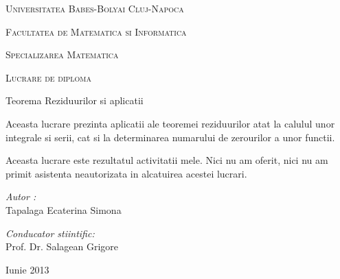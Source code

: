\documentclass[12pt,a4paper]{article}
\begin{document}
 \begin{center}
    { \textsc{Universitatea Babes-Bolyai Cluj-Napoca} \par
            \textsc{Facultatea de Matematica si Informatica} \par
            \textsc{Specializarea Matematica} \par }

    \vfill

    {\LARGE \textsc{Lucrare de diploma}}
    \null\vskip 1cm

    {\huge{Teorema Reziduurilor si aplicatii \par }}

    \vfill
    
    { 
    \begin{flushleft}
        Aceasta lucrare prezinta aplicatii ale teoremei reziduurilor atat la 
      calulul unor integrale si serii, cat si la determinarea numarului 
      de zerourilor a unor functii.
    \end{flushleft}
    }
    
    \vfill
        
    { 
    \begin{flushleft}
        Aceasta lucrare este rezultatul activitatii mele. Nici nu am oferit, nici nu am primit asistenta neautorizata in alcatuirea acestei lucrari.
    \end{flushleft}
    }
    
    \vfill
    
    \begin{minipage}[b]{0.51\linewidth}
        {\large \emph{Autor :}\\
            Tapalaga Ecaterina Simona}
    \end{minipage}
    \begin{minipage}[b]{0.48\linewidth}
        \begin{flushright}
            {\large \emph{Conducator stiintific:}\\
                Prof. Dr. Salagean Grigore}
        \end{flushright}
     \end{minipage}

    \vfill
    {\large \par Iunie 2013 \par}
    \end{center}
\end{document}
